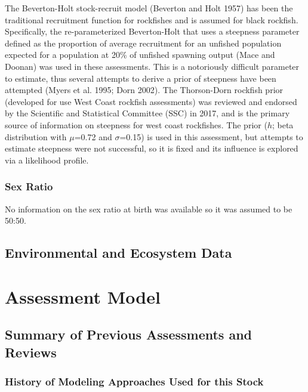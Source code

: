 \documentclass[11pt,
  english,
  letterpaper,
]{article}
\begin{document}
The Beverton-Holt stock-recruit model (Beverton and Holt 1957) has been the traditional recruitment function for rockfishes and is assumed for black rockfish. Specifically, the re-parameterized Beverton-Holt that uses a steepness parameter defined as the proportion of average recruitment for an unfished population expected for a population at 20\% of unfished spawning output (Mace and Doonan) was used in these assessments. This is a notoriously difficult parameter to estimate, thus several attempts to derive a prior of steepness have been attempted (Myers et al. 1995; Dorn 2002). The Thorson-Dorn rockfish prior (developed for use West Coast rockfish assessments) was reviewed and endorsed by the Scientific and Statistical Committee (SSC) in 2017, and is the primary source of information on steepness for west coast rockfishes. The prior (\(h\); beta distribution with \(\mu\)=0.72 and \(\sigma\)=0.15) is used in this assessment, but attempts to estimate steepness were not successful, so it is fixed and its influence is explored via a likelihood profile.

\hypertarget{sex-ratio}{%
\subsubsection{Sex Ratio}\label{sex-ratio}}

No information on the sex ratio at birth was available so it was assumed to be 50:50.

\hypertarget{environmental-and-ecosystem-data}{%
\subsection{Environmental and Ecosystem Data}\label{environmental-and-ecosystem-data}}

\hypertarget{assessment-model}{%
\section{Assessment Model}\label{assessment-model}}

\hypertarget{summary-of-previous-assessments-and-reviews}{%
\subsection{Summary of Previous Assessments and Reviews}\label{summary-of-previous-assessments-and-reviews}}

\hypertarget{history-of-modeling-approaches-used-for-this-stock}{%
\subsubsection{History of Modeling Approaches Used for this Stock}\label{history-of-modeling-approaches-used-for-this-stock}}
\end{document}
